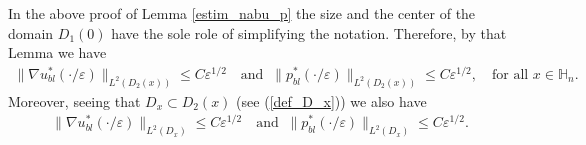 \documentclass[11pt, reqno]{amsart}
\theoremstyle{definition}
\theoremstyle{remark}
\numberwithin{equation}{section}
\begin{document}
	\noindent In the above proof of Lemma \ref{estim_nabu_p} the size and the center of the domain $D_1(0)$ have the sole role of simplifying the notation. Therefore, by that Lemma we have
	\begin{align*}
		\|\nabla u_{bl}^*(\cdot/\varepsilon) \|_{L^2(D_2(x))}\leq C\varepsilon^{1/2}\quad \mbox{and }\: \|p_{bl}^*(\cdot/\varepsilon) \|_{L^2(D_2(x))}\leq C\varepsilon^{1/2}, \quad \mbox{for all }  x\in\mathbb{H}_n.
	\end{align*}
	Moreover, seeing that $D_x\subset D_2(x)$ (see (\ref{def_D_x})) we also have 
	\begin{align}\label{bound_on_nab_u_and_p_eps}
		\|\nabla u_{bl}^*(\cdot/\varepsilon) \|_{L^2(D_x)}\leq C\varepsilon^{1/2}\quad \mbox{and }\: \|p_{bl}^*(\cdot/\varepsilon) \|_{L^2(D_x)}\leq C\varepsilon^{1/2}.
	\end{align}
	
	
	
	
	
\end{document}
